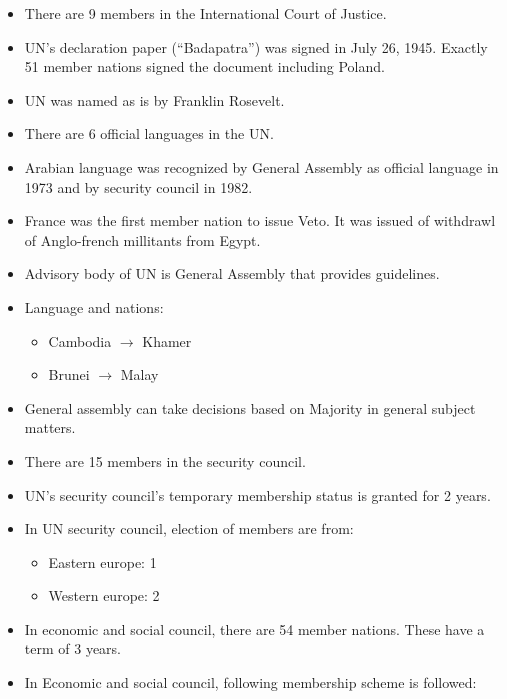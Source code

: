 \documentclass[
]{book}
\providecommand{\tightlist}{%
  \setlength{\itemsep}{0pt}\setlength{\parskip}{0pt}}
\begin{document}
\begin{itemize}
\item
  There are 9 members in the International Court of Justice.
\item
  UN's declaration paper (``Badapatra'') was signed in July 26, 1945. Exactly 51 member nations signed the document including Poland.
\item
  UN was named as is by Franklin Rosevelt.
\item
  There are 6 official languages in the UN.
\item
  Arabian language was recognized by General Assembly as official language in 1973 and by security council in 1982.
\item
  France was the first member nation to issue Veto. It was issued of withdrawl of Anglo-french millitants from Egypt.
\item
  Advisory body of UN is General Assembly that provides guidelines.
\item
  Language and nations:

  \begin{itemize}
  \tightlist
  \item
    Cambodia \(\longrightarrow\) Khamer
  \item
    Brunei \(\longrightarrow\) Malay
  \end{itemize}
\item
  General assembly can take decisions based on Majority in general subject matters.
\item
  There are 15 members in the security council.
\item
  UN's security council's temporary membership status is granted for 2 years.
\item
  In UN security council, election of members are from:

  \begin{itemize}
  \tightlist
  \item
    Eastern europe: 1
  \item
    Western europe: 2
  \end{itemize}
\item
  In economic and social council, there are 54 member nations. These have a term of 3 years.
\item
  In Economic and social council, following membership scheme is followed:


\end{itemize}
\end{document}
